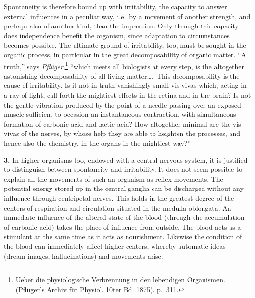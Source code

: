 \documentclass[12pt,a4paper]{book}
\newcommand{\opage}[1]{\marginnote{\footnotesize\textit{[#1]}}}
\begin{document}
Spontaneity is therefore bound up with irritability, the capacity to
answer external influences in a peculiar way, i.e.\ by a movement of
another strength, and perhaps also of another kind, than the impression.
Only through this capacity does independence benefit the organism, since
adaptation to circumstances becomes possible. The ultimate ground of
irritability, too, must be sought in the organic process, in particular
in the great decomposability of organic matter. ``A truth,'' says
\emph{Pflüger},\footnote{Ueber die physiologische Verbrennung in den
lebendigen Organismen. (Pflüger’s Archiv für Physiol. 10ter Bd. 1875).
p.~311.} ``which meets all biologists at every step, is the altogether
astonishing decomposability of all living matter\ldots.\ This
decomposability is the cause of irritability. Is it not in truth
vanishingly small vis vivas which, acting
\opage{367}in a ray of light, call forth the mightiest effects in the
retina and in the brain? Is not the gentle vibration produced by the
point of a needle passing over an exposed muscle sufficient to occasion
an instantaneous contraction, with simultaneous formation of carbonic
acid and lactic acid? How altogether minimal are the vis vivas of the
nerves, by whose help they are able to heighten the processes, and hence
also the chemistry, in the organs in the mightiest way?''

\textbf{3.} In higher organisms too, endowed with a central nervous
system, it is justified to distinguish between spontaneity and
irritability. It does not seem possible to explain all the movements of
such an organism as reflex movements. The potential energy stored up in
the central ganglia can be discharged without any influence through
centripetal nerves. This holds in the greatest degree of the centers of
respiration and circulation situated in the medulla oblongata. An
immediate influence of the altered state of the blood (through the
accumulation of carbonic acid) takes the place of influence from
outside. The blood acts as a stimulant at the same time as it acts as
nourishment. Likewise the condition of the blood can immediately affect
higher centers, whereby automatic ideas (dream-images, hallucinations)
and movements arise.
\end{document}
